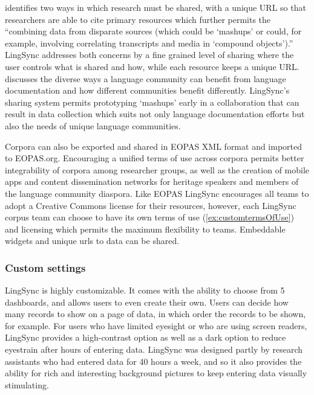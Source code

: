 \documentclass[letterpaper, 12pt, dvips]{mitwpl}
\begin{document}
\cite{Thieberger:2012}  identifies two ways in which research must be shared, with a unique URL so that researchers are able to cite primary resources which further permits the ``combining data from disparate sources (which could be `mashups' or could, for example, involving correlating transcripts and media in `compound objects').'' LingSync addresses both concerns by a fine grained level of sharing where the user controls what is shared and how, while each resource keeps a unique URL. \cite{Musgrave:2012} discusses the diverse ways a language community can benefit from language documentation and how different communities benefit differently. LingSync's sharing system permits prototyping `mashups' early in a collaboration that can result in data collection which suits not only language documentation efforts but also the needs of  unique language communities. 

Corpora can also be exported and shared in EOPAS XML format and imported to EOPAS.org.
Encouraging a unified terms of use across corpora permits better integrability of corpora among researcher groups,
as well as the creation of mobile apps and content dissemination networks for heritage speakers and members of the language community diaspora.
Like EOPAS \citep{EOPAS:2014:Online} LingSync encourages all teams to adopt a Creative Commons license for their resources,
however, each LingSync corpus team can choose to have its own terms of use (\ref{ex:customtermsOfUse}) and licensing which permits the maximum flexibility to teams.
Embeddable widgets and unique urls to data can be shared.




\subsubsection{Custom settings}

LingSync is highly customizable.
It comes with the ability to choose from 5 dashboards,
and allows users to even create their own.
Users can decide how many records to show on a page of data,
in which order the records to be shown, for example. %
For users who have limited eyesight or who are using screen readers,
LingSync provides a high-contrast option as well as a dark option to reduce eyestrain after hours of entering data.
LingSync was designed partly by research assistants who had entered data for 40 hours a week,
and so it also provides the ability for rich and  interesting background pictures to keep entering data visually stimulating.
\end{document}
